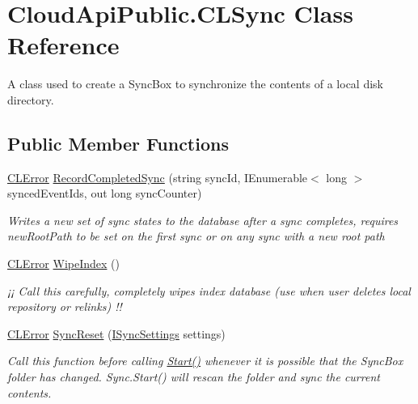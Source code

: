 \hypertarget{class_cloud_api_public_1_1_c_l_sync}{\section{Cloud\-Api\-Public.\-C\-L\-Sync Class Reference}
\label{class_cloud_api_public_1_1_c_l_sync}
}


A class used to create a Sync\-Box to synchronize the contents of a local disk directory.  


\subsection*{Public Member Functions}
\begin{DoxyCompactItemize}
\item 
\hyperlink{class_cloud_api_public_1_1_model_1_1_c_l_error}{C\-L\-Error} \hyperlink{class_cloud_api_public_1_1_c_l_sync_ae42abebf3134701ec50ea49002eb8291}{Record\-Completed\-Sync} (string sync\-Id, I\-Enumerable$<$ long $>$ synced\-Event\-Ids, out long sync\-Counter)
\begin{DoxyCompactList}\small\item\em Writes a new set of sync states to the database after a sync completes, requires new\-Root\-Path to be set on the first sync or on any sync with a new root path \end{DoxyCompactList}\item 
\hyperlink{class_cloud_api_public_1_1_model_1_1_c_l_error}{C\-L\-Error} \hyperlink{class_cloud_api_public_1_1_c_l_sync_a3bbf0e1f002b7cedd12e16562c071dce}{Wipe\-Index} ()
\begin{DoxyCompactList}\small\item\em ¡¡ Call this carefully, completely wipes index database (use when user deletes local repository or relinks) !! \end{DoxyCompactList}\item 
\hyperlink{class_cloud_api_public_1_1_model_1_1_c_l_error}{C\-L\-Error} \hyperlink{class_cloud_api_public_1_1_c_l_sync_a81d09690e5f271bf5cb75f86a855e201}{Sync\-Reset} (\hyperlink{interface_cloud_api_public_1_1_interfaces_1_1_i_sync_settings}{I\-Sync\-Settings} settings)
\begin{DoxyCompactList}\small\item\em Call this function before calling \hyperlink{class_cloud_api_public_1_1_c_l_sync_a87c00cb5f140959bf0a26a43bdd87cf5}{Start()} whenever it is possible that the Sync\-Box folder has changed. Sync.\-Start() will rescan the folder and sync the current contents. \end{DoxyCompactList}\item 

\end{DoxyCompactItemize}

